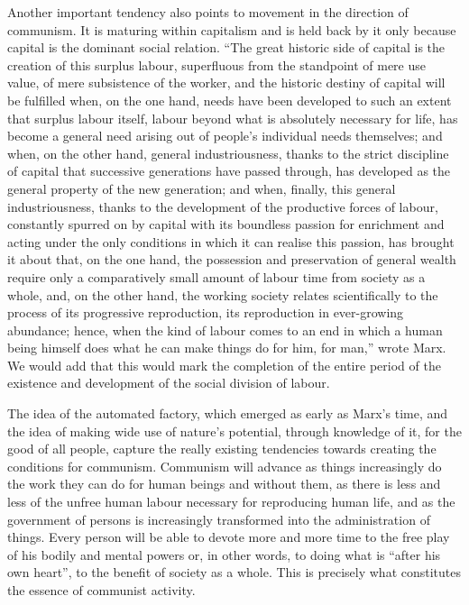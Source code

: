 \documentclass[12pt,a4paper,openany]{book}
\begin{document}
Another important tendency also points to movement in the direction of communism. It is maturing within capitalism and is held back by it only because capital is the dominant social relation. “The great historic side of capital is the creation of this surplus labour, superfluous from the standpoint of mere use value, of mere subsistence of the worker, and the historic destiny of capital will be fulfilled when, on the one hand, needs have been developed to such an extent that surplus labour itself, labour beyond what is absolutely necessary for life, has become a general need arising out of people’s individual needs themselves; and when, on the other hand, general industriousness, thanks to the strict discipline of capital that successive generations have passed through, has developed as the general property of the new generation; and when, finally, this general industriousness, thanks to the development of the productive forces of labour, constantly spurred on by capital with its boundless passion for enrichment and acting under the only conditions in which it can realise this passion, has brought it about that, on the one hand, the possession and preservation of general wealth require only a comparatively small amount of labour time from society as a whole, and, on the other hand, the working society relates scientifically to the process of its progressive reproduction, its reproduction in ever-growing abundance; hence, when the kind of labour comes to an end in which a human being himself does what he can make things do for him, for man,” wrote Marx. We would add that this would mark the completion of the entire period of the existence and development of the social division of labour.

The idea of the automated factory, which emerged as early as Marx’s time, and the idea of making wide use of nature’s potential, through knowledge of it, for the good of all people, capture the really existing tendencies towards creating the conditions for communism. Communism will advance as things increasingly do the work they can do for human beings and without them, as there is less and less of the unfree human labour necessary for reproducing human life, and as the government of persons is increasingly transformed into the administration of things. Every person will be able to devote more and more time to the free play of his bodily and mental powers or, in other words, to doing what is “after his own heart”, to the benefit of society as a whole. This is precisely what constitutes the essence of communist activity.
\end{document}
